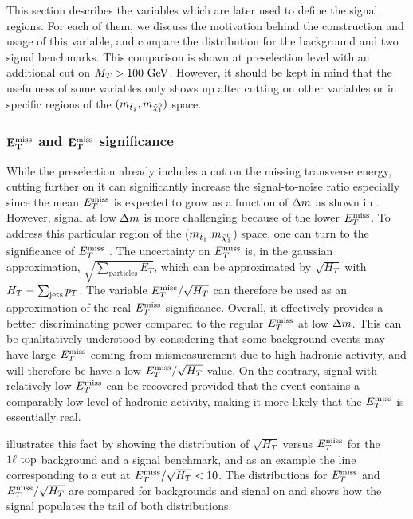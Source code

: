     This section describes the variables which are later used to define the
    signal regions. For each of them, we discuss the motivation behind the
    construction and usage of this variable, and compare the distribution for
    the background and two signal benchmarks. This comparison is shown at
    preselection level with an additional cut on $M_T > 100~\text{GeV}$. However, it
    should be kept in mind that the usefulness of some variables only shows up
    after cutting on other variables or in specific regions of the
    $(m_{\tilde{t}_1},m_{\tilde{\chi}_1^0})$ space.

    \subsubsection{$\mathbf{E_T^\text{miss}}$ and $\mathbf{E_T^\text{miss}}$ significance}

    While the preselection already includes a cut on the missing transverse
    energy, cutting further on it can significantly increase the signal-to-noise
    ratio especially since the mean $E_T^\text{miss}$ is expected to grow as a function of
    $\Delta m$ as shown in . However, signal at low
    $\Delta m$ is more challenging because of the lower $E_T^\text{miss}$. To address this
    particular region of the ($m_{\tilde{t}_1}$,$m_{\tilde{\chi}_1^0}$) space, one
    can turn to the significance of $E_T^\text{miss}$ \cite{METperf,
    METsignificanceMirman}. The uncertainty on $E_T^\text{miss}$ is, in the gaussian
    approximation, $\sqrt{\sum_\text{particles} E_T}$, which can be approximated
    by $\sqrt{H_T}$ with $H_T \equiv \sum_\text{jets} p_T$.  The variable
    $E_T^\text{miss} / \sqrt{H_T}$ can therefore be used as an approximation of the real
    $E_T^\text{miss}$ significance. Overall, it effectively provides a better
    discriminating power compared to the regular $E_T^\text{miss}$ at low $\Delta m$. This
    can be qualitatively understood by considering that some background events
    may have large $E_T^\text{miss}$ coming from mismeasurement due to high hadronic
    activity, and will therefore be have a low $E_T^\text{miss}/\sqrt{H_T}$ value. On the
    contrary, signal with relatively low $E_T^\text{miss}$ can be recovered provided that
    the event contains a comparably low level of hadronic activity, making it
    more likely that the $E_T^\text{miss}$ is essentially real.

     illustrates this fact by showing the distribution
    of $\sqrt{H_T}$ versus $E_T^\text{miss}$ for the $1\ell~\text{top}$ background and a
    signal benchmark, and as an example the line corresponding to a cut at $E_T^\text{miss}
    / \sqrt{H_T} < 10$. The distributions for $E_T^\text{miss}$ and $E_T^\text{miss} / \sqrt{H_T}$ are
    compared for backgrounds and signal on
     and shows how the signal
    populates the tail of both distributions.

